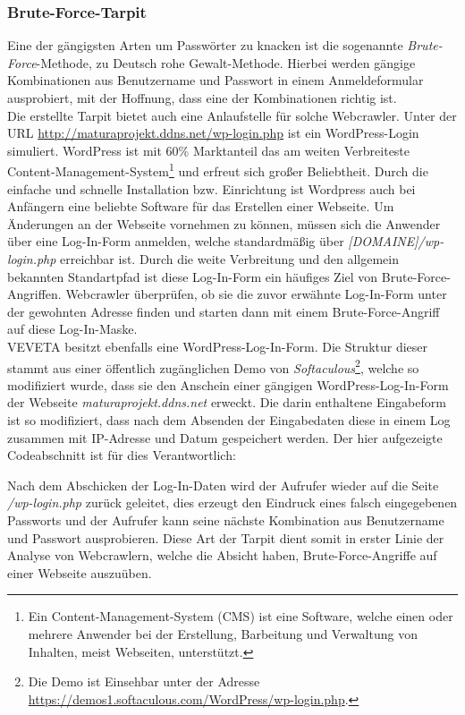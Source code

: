 \subsubsection{Brute-Force-Tarpit}
Eine der gängigsten  Arten um Passwörter zu knacken ist die sogenannte \emph{Brute-Force}-Methode, zu Deutsch \glqq rohe Gewalt\grqq-Methode. Hierbei werden gängige Kombinationen aus Benutzername und Passwort in einem Anmeldeformular ausprobiert, mit der Hoffnung, dass eine der Kombinationen richtig ist.\\
Die erstellte Tarpit bietet auch eine Anlaufstelle für solche Webcrawler. Unter der URL \url{http://maturaprojekt.ddns.net/wp-login.php} ist ein WordPress-Login simuliert. WordPress ist mit 60\% Marktanteil\cite{wordpress-verbreitung} das am weiten Verbreiteste Content-Management-System\footnote{Ein Content-Management-System (CMS) ist eine Software, welche einen oder mehrere Anwender bei der Erstellung, Barbeitung und Verwaltung von Inhalten, meist Webseiten, unterstützt.} und erfreut sich großer Beliebtheit. Durch die einfache und schnelle Installation bzw. Einrichtung ist Wordpress auch bei Anfängern eine beliebte Software für das Erstellen einer Webseite. Um Änderungen an der Webseite vornehmen zu können, müssen sich die Anwender über eine Log-In-Form anmelden, welche standardmäßig über \emph{[DOMAINE]/wp-login.php} erreichbar ist. Durch die weite Verbreitung und den allgemein bekannten Standartpfad ist diese Log-In-Form ein häufiges Ziel von Brute-Force-Angriffen. Webcrawler überprüfen, ob sie die zuvor erwähnte Log-In-Form unter der gewohnten Adresse finden und starten dann mit einem Brute-Force-Angriff auf diese Log-In-Maske.\\
VEVETA besitzt ebenfalls eine WordPress-Log-In-Form. Die Struktur dieser stammt aus einer öffentlich zugänglichen Demo von \emph{Softaculous}\footnote{Die Demo ist Einsehbar unter der Adresse \url{https://demos1.softaculous.com/WordPress/wp-login.php}.}, welche so modifiziert wurde, dass sie den Anschein einer gängigen WordPress-Log-In-Form der Webseite \emph{maturaprojekt.ddns.net} erweckt. Die darin enthaltene Eingabeform ist so modifiziert, dass nach dem Absenden der Eingabedaten diese in einem Log zusammen mit IP-Adresse und Datum gespeichert werden. Der hier aufgezeigte Codeabschnitt ist für dies Verantwortlich:

Nach dem Abschicken der Log-In-Daten wird der Aufrufer wieder auf die Seite \emph{/wp-login.php} zurück geleitet, dies erzeugt den Eindruck eines falsch eingegebenen Passworts und der Aufrufer kann seine nächste Kombination aus Benutzername und Passwort ausprobieren. Diese Art der Tarpit dient somit in erster Linie der Analyse von Webcrawlern, welche die Absicht haben, Brute-Force-Angriffe auf einer Webseite auszuüben.
\label{subsub:brufe-force-tarpit}